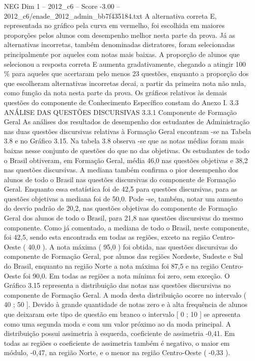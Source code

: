 \begin{textsample}{NEG Dim 1 – 2012\_c6 – Score -3.00 – 2012\_c6/enade\_2012\_admin\_bb7f435184.txt}
A alternativa correta E, representada no gráfico pela curva em vermelho, foi escolhida em maiores proporções pelos alunos com desempenho melhor nesta parte da prova.
Já as alternativas incorretas, também denominadas distratores, foram selecionadas principalmente por aqueles com notas mais baixas.
A proporção de alunos que selecionou a resposta correta E aumenta gradativamente, chegando a atingir 100 \% para aqueles que acertaram pelo menos 23 questões, enquanto a proporção dos que escolheram alternativas incorretas decai, a partir da primeira nota não nula, como função da nota nesta parte da prova.
Os gráficos relativos às demais questões do componente de Conhecimento Específico constam do Anexo I. 3.3 ANÁLISE DAS QUESTÕES DISCURSIVAS 3.3.1 Componente de Formação Geral As análises dos resultados de desempenho dos estudantes de Administração nas duas questões discursivas relativas à Formação Geral encontram -se na Tabela 3.8 e no Gráfico 3.15.
Na tabela 3.8 observa -se que as notas médias foram mais baixas nesse conjunto de questões do que no das objetivas.
Os estudantes de todo o Brasil obtiveram, em Formação Geral, média 46,0 nas questões objetivas e 38,2 nas questões discursivas.
A mediana também confirma o pior desempenho dos alunos de todo o Brasil nas questões discursivas do componente de Formação Geral.
Enquanto essa estatística foi de 42,5 para questões discursivas, para as questões objetivas a mediana foi de 50,0.
Pode -se, também, notar um aumento do desvio padrão de 20,2, nas questões objetivas do componente de Formação Geral dos alunos de todo o Brasil, para 21,8 nas questões discursivas do mesmo componente.
Como já comentado, a mediana de todo o Brasil, neste componente, foi 42,5, sendo esta encontrada em todas as regiões, exceto na região Centro-Oeste ( 40,0 ).
A nota máxima ( 95,0 ) foi obtida, nas questões discursivas do componente de Formação Geral, por alunos das regiões Nordeste, Sudeste e Sul do Brasil, enquanto na região Norte a nota máxima foi 87,5 e na região Centro-Oeste foi 90,0.
Em todas as regiões a nota mínima foi zero, sem exceção.
O Gráfico 3.15 representa a distribuição das notas nas questões discursivas no componente de Formação Geral.
A moda desta distribuição ocorre no intervalo ( 40 ; 50 ].
Devido à grande quantidade de notas zero e à alta frequência de alunos que deixaram este tipo de questão em branco o intervalo [ 0 ; 10 ] se apresenta como uma segunda moda e com um valor próximo ao da moda principal.
A distribuição possui assimetria à esquerda, coeficiente de assimetria -0,41.
Em todas as regiões o coeficiente de assimetria também é negativo, o maior em módulo, -0,47, na região Norte, e o menor na região Centro-Oeste ( -0,33 ).

\end{textsample}
